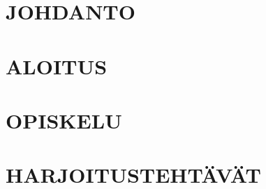 
\tableofcontents




\glsaddall
{}
\setlength{\glsnamewidth}{0.25\textwidth}
\setlength{\glsdescwidth}{0.75\textwidth}
\renewcommand*{\glsgroupskip}{}

\printglossary[title={Lyhenteet ja merkinnät}]



\mainmatter

\chapter{JOHDANTO}
\label{ch:johdanto}


\chapter{ALOITUS}
\label{ch:aloitus}


\chapter{OPISKELU}
\label{ch:opiskelu}


\chapter{HARJOITUSTEHTÄVÄT}
\label{ch:harjoitustehtavat}


